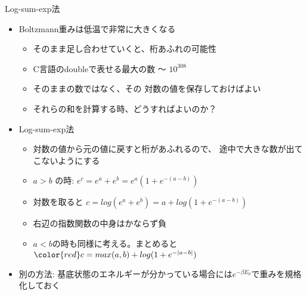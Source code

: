 \begin{frame}[t,fragile]{Log-sum-exp法}
  \begin{itemize}
  \item Boltzmann重みは低温で非常に大きくなる
    \begin{itemize}
    \item そのまま足し合わせていくと、桁あふれの可能性
    \item C言語のdoubleで表せる最大の数 〜 $10^{308}$
    \item そのままの数ではなく、その{\color{red} 対数の値を保存}しておけばよい
    \item それらの和を計算する時、どうすればよいのか？
    \end{itemize}
  \item Log-sum-exp法
    \begin{itemize}
    \item 対数の値から元の値に戻すと桁があふれるので、{\color{red} 途中で大きな数が出てこないように}する
    \item $a > b$ の時: $e^c = e^a + e^b = e^a (1 + e^{-(a-b)})$
    \item 対数を取ると $c = log(e^a + e^b) = a + log(1 + e^{-(a-b)})$
    \item 右辺の指数関数の中身はかならず負
    \item $a < b$の時も同様に考える。まとめると \\
      $\color{red} c = max(a,b) + log(1 + e^{-|a-b|})$
    \end{itemize}
  \item 別の方法: 基底状態のエネルギーが分かっている場合には$e^{-\beta E_0}$で重みを規格化しておく
  \end{itemize}
\end{frame}
